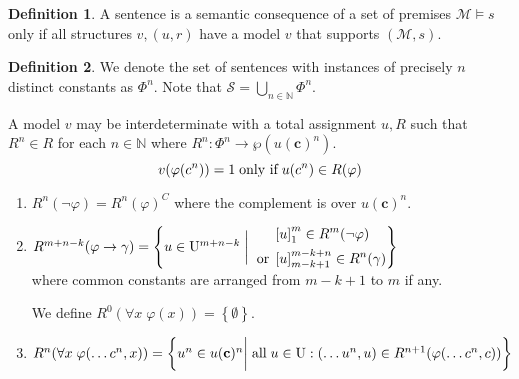 \documentclass{amsbook}
\newcommand{\setsm}[1]{\left\{#1\right\}}
\newcommand{\univ}[1]{\mathord\forall#1\;}
\newcommand{\valids}{\mathrel\vDash}
\newcommand{\then}{\mathrel\rightarrow}
\theoremstyle{definition}
\newtheorem{dfn}{Definition}[section]
\begin{document}
\begin{dfn}
    A sentence is a semantic consequence of a set of premises $\mathcal M \valids s$ only if all structures $v, (u, r)$ have a model $v$ that supports $(\mathcal M, s)$.
\end{dfn}

\begin{dfn}
    We denote the set of sentences with instances of precisely $n$ distinct constants as $\Phi^n$. Note that $\mathcal S = \bigcup_{n \in \mathbb N} \Phi^n$.

    A model $v$ may be interdeterminate with a total assignment $u, R$ such that $R^n \in R$ for each $n \in \mathbb N$ where $R^n: \Phi^n \longrightarrow \wp(u(\mathbf c)^n)$.
    $$v(\varphi(c^n)) = 1 \text{\;only if\;} u(c^n) \in R(\varphi)$$
    \begin{enumerate}
        \item $R^n(\neg\varphi) = R^n(\varphi)^C$ where the complement is over $u(\mathbf c)^n$.
        \item $R^{m+n-k}(\varphi \then \gamma) = \setsm{u \in \mathrm U^{m+n-k} \mathrel\bigg| \begin{aligned}
                           & \left[ u \right]_1^m \in R^m(\neg\varphi)        \\
                          \text{\;or\;}
                           & \left[ u \right]_{m-k+1}^{m-k+n} \in R^n(\gamma)
                      \end{aligned} }$ \\
              where common constants are arranged from $m-k+1$ to $m$ if any.

              We define $R^0(\univ x \varphi(x)) = \setsm\emptyset$.
        \item $R^n(\univ x \varphi(\dots c^n, x))\\ = \left\{ u^n \in u(\mathbf c)^n \bigg| \text{\;all\;} u\in\mathrm U : (\dots u^n, u) \in R^{n+1}(\varphi(\dots c^n, c)) \right\}$
    \end{enumerate}
\end{dfn}
\end{document}

